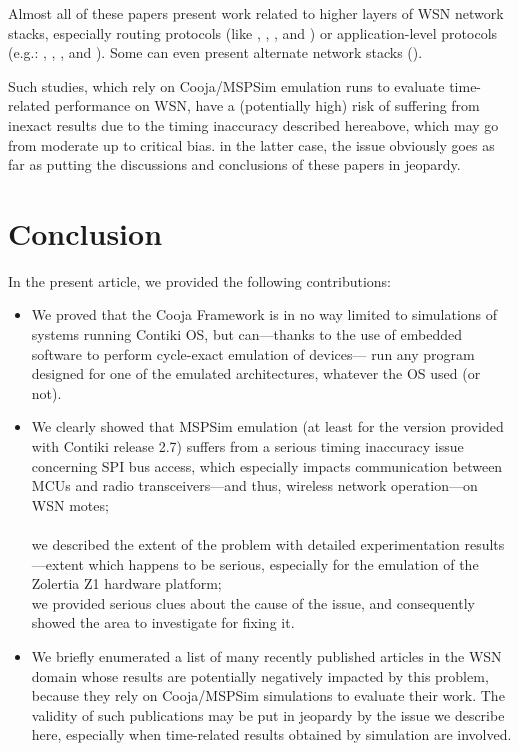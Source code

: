 \documentclass[10pt]{ewsn-proc}
\begin{document}
\medskip

Almost all of these papers present work related to higher layers of
WSN network stacks, especially routing protocols (like
\cite{Constrain-Routing-Trees-2014},
\cite{Co-RPL-2014}, \cite{IETF-Routing-WSN-2014},
and \cite{Trickle-L2-2014})
or application-level protocols (e.g.: \cite{DINAS-2014},
\cite{Efficient-Distrib-Svc-Discovery-2014},
\cite{Visual-Sensor-Networks-2014}, and \cite{Key-Mgmt-2015}).
Some can even present alternate network stacks (\cite{TinySDN-2014}).

\medskip

Such studies, which rely on Cooja/MSPSim emulation runs to evaluate
time-related performance on WSN, have a (potentially high) risk of
suffering from inexact results due to the timing inaccuracy described
hereabove, which may go from moderate up to critical bias.
in the latter case, the issue obviously goes as far as putting
the discussions and conclusions of these papers in jeopardy.



\section{Conclusion}
\label{conclusion}

In the present article, we provided the following contributions:

\medskip

\begin{itemize}
\item We proved that the Cooja Framework is in no way limited to simulations
of systems running Contiki OS, but can---thanks to the use of embedded
software to perform cycle-exact emulation of devices--- run any program
designed for one of the emulated architectures, whatever the OS used
(or not).
\ \\
\item We clearly showed that MSPSim emulation (at least for the version
provided with Contiki release 2.7) suffers from a serious timing
inaccuracy issue concerning SPI bus access, which especially impacts
communication between MCUs and radio transceivers---and thus, wireless
network operation---on WSN motes;\\
\ \\
we described the extent of the problem with detailed experimentation
results---extent which happens to be serious, especially for the emulation
of the Zolertia Z1 hardware platform;\\
we provided serious clues about the cause of the issue, and
consequently showed the area to investigate for fixing it.
\item We briefly enumerated a list of many recently published articles in the
WSN domain whose results are potentially negatively impacted by this problem,
because they rely on Cooja/MSPSim simulations to evaluate their work.
The validity of such publications may be put in jeopardy by the
issue we describe here, especially when time-related results
obtained by simulation are involved.
\end{itemize}
\end{document}
